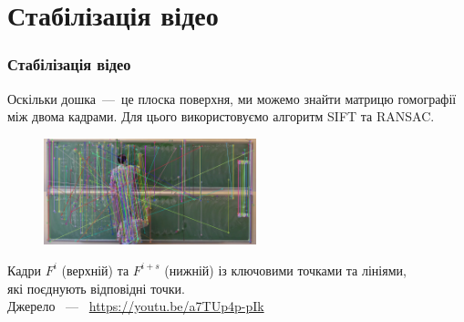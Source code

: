 \section{Стабілізація відео}
\begin{frame}
  \frametitle{Стабілізація відео}

  Оскільки дошка~---~це плоска поверхня, ми можемо знайти матрицю гомографії між двома кадрами.
  Для цього використовуємо алгоритм SIFT та RANSAC.
  \begin{figure}[H]
    \centering
    \includegraphics[width=0.55\textwidth]{images/matches_img}
  \end{figure}
  \begin{center}
    Кадри $F^i$ (верхній) та $F^{i+s}$ (нижній) із ключовими точками та лініями,\\
    які поєднують відповідні точки. \\
    Джерело ~---~ \url{https://youtu.be/a7TUp4p-pIk}
  \end{center}
\end{frame}
